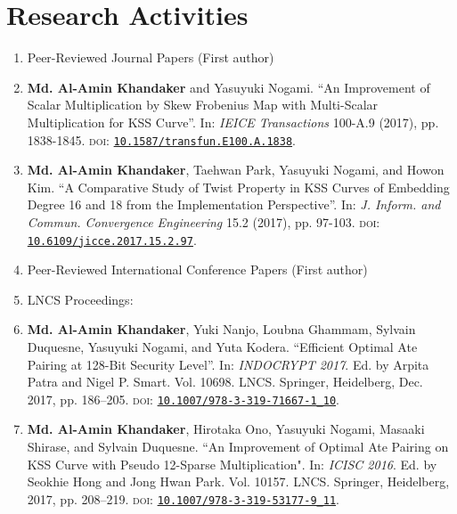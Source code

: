 \newpage
\clearpage
\pagestyle{plain}
\chapter{Research Activities} 
\label{research_activity}
\begin{enumerate}
	\Large
	\item[] Peer-Reviewed Journal Papers  (First author)
	\normalsize
	\item \textbf{Md. Al-Amin Khandaker} and Yasuyuki Nogami. “An Improvement of Scalar Multiplication by Skew Frobenius Map with Multi-Scalar Multiplication for KSS Curve”. In: \textit{IEICE Transactions} 100-A.9 (2017), pp. 1838-1845. \textsc{doi}: \href{https://doi.org/10.1587/transfun.E100.A.1838}{\texttt{10.1587/transfun.E100.A.1838}}.

	\normalsize
	\item\textbf{Md. Al-Amin Khandaker}, Taehwan Park, Yasuyuki Nogami, and Howon Kim. “A Comparative Study of Twist Property in KSS Curves of Embedding Degree 16 and 18 from the Implementation Perspective”. In: \textit{J. Inform. and Commun. Convergence Engineering} 15.2 (2017),  pp. 97-103. \textsc{doi}: \href{https://doi.org/10.6109/jicce.2017.15.2.97}{\texttt{10.6109/jicce.2017.15.2.97}}.
\vspace{10mm}
	\item[ ] \Large Peer-Reviewed International Conference Papers  (First author)
\normalsize
	\item[ ] \Large LNCS Proceedings:
	\normalsize
	\item \textbf{Md. Al-Amin Khandaker}, Yuki Nanjo, Loubna Ghammam, Sylvain Duquesne, Yasuyuki Nogami, and Yuta Kodera. “Efficient Optimal Ate Pairing at 128-Bit Security Level”. In: \textit{INDOCRYPT 2017}. Ed. by Arpita Patra
	and Nigel P. Smart. Vol. 10698. LNCS. Springer, Heidelberg, Dec. 2017, pp. 186–205. \textsc{doi}: \href{https://doi.org/10.1007/978-3-319-71667-1_10}{\texttt{10.1007/978-3-319-71667-1\_10}}.
	
	\item \textbf{Md. Al-Amin Khandaker}, Hirotaka Ono, Yasuyuki Nogami, Masaaki Shirase, and Sylvain Duquesne. ``An Improvement of Optimal Ate Pairing
	on KSS Curve with Pseudo 12-Sparse Multiplication". In: \textit{ICISC 2016}. Ed. by Seokhie Hong and Jong Hwan Park. Vol. 10157. LNCS. Springer, Heidelberg, 2017, pp. 208–219. \textsc{doi}: \href{https://doi.org/10.1007/978-3-319-53177-9_11}{\texttt{10.1007/978-3-319-53177-9\_11}}.
	

\end{enumerate}
